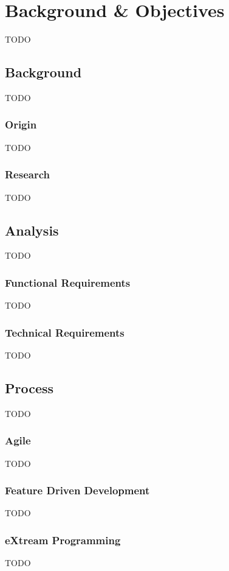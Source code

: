 \chapter{Background \& Objectives}

{TODO}



\section{Background}

{TODO}

\subsection{Origin}

{TODO}

\subsection{Research}

{TODO}


\section{Analysis}

{TODO}

\subsection{Functional Requirements}

{TODO}

\subsection{Technical Requirements}

{TODO}


\section{Process}

{TODO}

\subsection{Agile}

{TODO}

\subsection{Feature Driven Development}

{TODO}

\subsection{eXtream Programming}

{TODO}